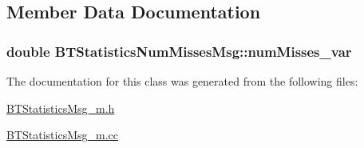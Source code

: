 \subsection{Member Data Documentation}
\hypertarget{classBTStatisticsNumMissesMsg_a28bbdae0b44bd313c2377e841097b5b4}{}
\subsubsection[{num\+Misses\+\_\+var}]{\setlength{\rightskip}{0pt plus 5cm}double B\+T\+Statistics\+Num\+Misses\+Msg\+::num\+Misses\+\_\+var\hspace{0.3cm}{\ttfamily [protected]}}\label{classBTStatisticsNumMissesMsg_a28bbdae0b44bd313c2377e841097b5b4}


The documentation for this class was generated from the following files\+:\begin{DoxyCompactItemize}
\item 
\hyperlink{BTStatisticsMsg__m_8h}{B\+T\+Statistics\+Msg\+\_\+m.\+h}\item 
\hyperlink{BTStatisticsMsg__m_8cc}{B\+T\+Statistics\+Msg\+\_\+m.\+cc}\end{DoxyCompactItemize}
